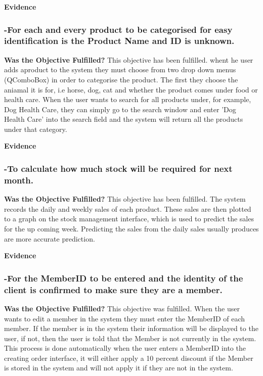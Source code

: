 \textbf{Evidence} \newline




\subsubsection{-For each and every product to be categorised for easy identification is the Product Name and ID is unknown.}

\textbf{Was the Objective Fulfilled?} \newline
This objective has been fulfilled. whent he user adds aproduct to the system they must choose from two drop down menus (QComboBox) in order to categorise the product. The first they choose the aniamal it is for, i.e horse, dog, cat and whether the product comes under food or health care. When the user wants to search for all products under, for example, Dog Health Care, they can simply go to the search window and enter 'Dog Health Care' into the search field and the system will return all the products under that category.

\textbf{Evidence} \newline





\subsubsection{-To calculate how much stock will be required for next month.}
\label{stock-eval}
\textbf{Was the Objective Fulfilled?} \newline
This objective has been fulfilled. The system records the daily and weekly sales of each product. These sales are then plotted to a graph on the stock management interface, which is used to predict the sales for the up coming week. Predicting the sales from the daily sales usually produces are more accurate prediction.

\textbf{Evidence} \newline





\subsubsection{-For the MemberID to be entered and the identity of the client is confirmed to make sure they are a member.}
\textbf{Was the Objective Fulfilled?} \newline
This objective was fulfilled. When the user wants to edit a member in the system they must enter the MemberID of each member. If the member is in the system their information will be displayed to the user, if not, then the user is told that the Member is not currently in the system. This process is done automatically when the user enters a MemberID into the creating order interface, it will either apply a 10 percent discount if the Member is stored in the system and will not apply it if they are not in the system.

